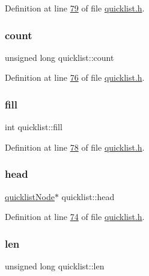 Definition at line \hyperlink{quicklist_8h_source_l00079}{79} of file \hyperlink{quicklist_8h_source}{quicklist.\+h}.

\mbox{\label{structquicklist_ae01a064383db201bda229445ac9e309b}} 
\subsubsection{\texorpdfstring{count}{count}}
{\footnotesize\ttfamily unsigned long quicklist\+::count}



Definition at line \hyperlink{quicklist_8h_source_l00076}{76} of file \hyperlink{quicklist_8h_source}{quicklist.\+h}.

\mbox{\label{structquicklist_a405f7313891bdb6c29b937b04fa468ee}} 
\subsubsection{\texorpdfstring{fill}{fill}}
{\footnotesize\ttfamily int quicklist\+::fill}



Definition at line \hyperlink{quicklist_8h_source_l00078}{78} of file \hyperlink{quicklist_8h_source}{quicklist.\+h}.

\mbox{\label{structquicklist_a7ac8ca1117d875b12a219b2ada754e4b}} 
\subsubsection{\texorpdfstring{head}{head}}
{\footnotesize\ttfamily \hyperlink{structquicklistNode}{quicklist\+Node}$\ast$ quicklist\+::head}



Definition at line \hyperlink{quicklist_8h_source_l00074}{74} of file \hyperlink{quicklist_8h_source}{quicklist.\+h}.

\mbox{\label{structquicklist_a35a5c4c4e533b277aedab1bb6c193f76}} 
\subsubsection{\texorpdfstring{len}{len}}
{\footnotesize\ttfamily unsigned long quicklist\+::len}



